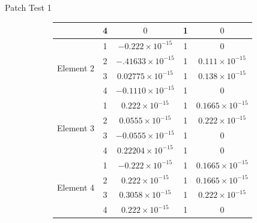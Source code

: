 \documentclass{beamer}
\begin{document}
\begin{frame}[t,fragile]{Patch Test 1}
\begin{figure}
\begin{subfigure}{0.45\textwidth}
{\begin{tabular}{|c|c|c|c|c|}
& 4 & $0$ & 1 & $0$\\
\hline
\multirow{4}{5em}{Element 2} & 1 & $-0.222\times 10^{-15}$ & 1 & $0$\\
& 2 & $-.41633\times 10^{-15}$ & 1 & $0.111\times 10^{-15}$\\
& 3 & $0.02775\times 10^{-15}$ & 1 & $0.138\times 10^{-15}$\\
& 4 & $-0.1110\times 10^{-15}$ & 1 & $0$\\
\hline
\multirow{4}{5em}{Element 3} & 1 & $0.222\times 10^{-15}$ & 1 & $0.1665\times 10^{-15}$\\
& 2 & $0.0555\times 10^{-15}$ & 1 & $0.222\times 10^{-15}$\\
& 3 & $-0.0555\times 10^{-15}$ & 1 & $0$\\
& 4 & $0.22204\times 10^{-15}$ & 1 & $0$\\
\hline
\multirow{4}{5em}{Element 4} & 1 & $-0.222\times 10^{-15}$ & 1 & $0.1665\times 10^{-15}$\\
& 2 & $0.222\times 10^{-15}$ & 1 & $0.1665\times 10^{-15}$\\
& 3 & $0.3058\times 10^{-15}$ & 1 & $0.222\times 10^{-15}$\\
& 4 & $0.222\times 10^{-15}$ & 1 & $0$\\
\hline
\end{tabular}}
      \end{subfigure}
  \end{figure}
\end{frame}
\end{document}

